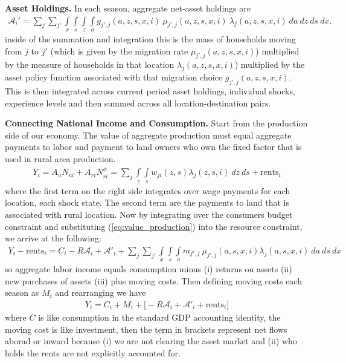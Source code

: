 \documentclass[12pt,pdftex]{article}
\begin{document}
\begin{onehalfspacing}
\textbf{Asset Holdings.} In each season, aggregate net-asset holdings are
\begin{align}
\mathcal{A}_i' = \sum_{j}\sum_{j'}   \int\limits_{x} \int\limits_{s} \int\limits_{z} \int\limits_{a} g_{j',j}(a, z, s, x, i) \  \mu_{j',j}(a, z, s, x, i) \ \lambda_j(a, z, s, x, i) \ da  \ dz \ ds \ dx.
\label{eq:aggregate_asset}
\end{align}
inside of the summation and integration this is the mass of households moving from $j$ to $j'$ (which is given by the migration rate $\mu_{j',j}(a, z, s, x, i)$)  multiplied by the measure of households in that location $\lambda_j(a, z, s, x, i)$) multiplied by the asset policy function associated with that migration choice $g_{j',j}(a, z, s, x, i)$. This is then integrated across current period asset holdings, individual shocks, experience levels and then summed across all location-destination pairs.

\textbf{Connecting National Income and Consumption.} Start from the production side of our economy. The value of aggregate production must equal aggregate payments to labor and payment to land owners who own the fixed factor that is used in rural area production.
\begin{align}
Y_i = A_u N_{ui} + A_{ri}N_{ri}^{\phi} = \sum_{j} \int\limits_{z} \int\limits_{s} w_{ji}(z, s)\lambda_j(z, s,i)\ dz \ ds + \mbox{rents}_{i}
\label{eq:value_production}
\end{align}
where the first term on the right side integrates over wage payments for each location, each shock state. The second term are the payments to land that is associated with rural location. Now by integrating over the consumers budget constraint and substituting (\ref{eq:value_production}) into the resource constraint, we arrive at the following:
\begin{align}
Y_i - \mbox{rents}_{i} = C_i - R\mathcal{A}_i +  \mathcal{A'}_i  + \sum_{j}\sum_{j'} \int\limits_{x} \int\limits_{s} \int\limits_{a} m_{j',j} \ \mu_{j',j}(a, s, x, i) \lambda_j(a, s, x, i) \ da \ ds \ dx
\label{eq:expenditure_side_gdp}
\end{align}
so aggregate labor income equals consumption minus (i) returns on assets (ii) new purchases of assets (iii) plus moving costs. Then defining moving costs each season as $M_i$ and rearranging we have
\begin{align}
Y_i = C_i  + M_i + \bigg[-R\mathcal{A}_i +  \mathcal{A'}_i + \mbox{rents}_{i}\bigg]
\label{eq:income_side_gdp2}
\end{align}
where $C$ is like consumption in the standard GDP accounting identity, the moving cost is like investment, then the term in brackets represent net flows aborad or inward because (i) we are not clearing the asset market and (ii) who holds the rents are not explicitly accounted for.


\end{onehalfspacing}
\end{document}
